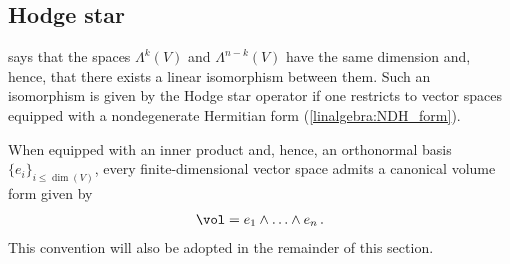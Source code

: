 \subsection{Hodge star}

     says that the spaces $\Lambda^k(V)$ and $\Lambda^{n-k}(V)$ have the same dimension and, hence, that there exists a linear isomorphism between them. Such an isomorphism is given by the Hodge star operator if one restricts to vector spaces equipped with a nondegenerate Hermitian form (\cref{linalgebra:NDH_form}).

    When equipped with an inner product and, hence, an orthonormal basis $\{e_i\}_{i\leq\dim(V)}$, every finite-dimensional vector space admits a canonical volume form given by
    \begin{gather}
        \vol = e_1\wedge\ldots\wedge e_n\,.
    \end{gather}
    This convention will also be adopted in the remainder of this section.


